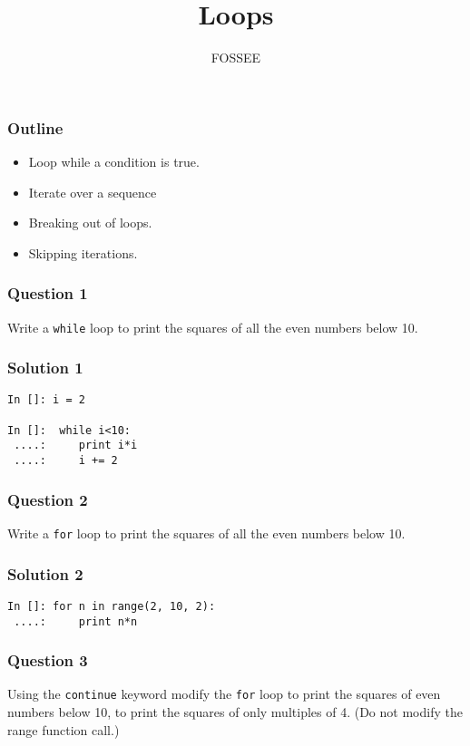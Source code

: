\documentclass[presentation]{beamer}
\title{Loops}
\author{FOSSEE}
\date{}
\begin{document}
\maketitle









\begin{frame}
\frametitle{Outline}
\label{sec-1}

\begin{itemize}
\item Loop while a condition is true.
\item Iterate over a sequence
\item Breaking out of loops.
\item Skipping iterations.
\end{itemize}
\end{frame}
\begin{frame}
\frametitle{Question 1}
\label{sec-2}

  Write a \texttt{while} loop to print the squares of all the even
  numbers below 10. 
\end{frame}
\begin{frame}[fragile]
\frametitle{Solution 1}
\label{sec-3}

\lstset{language=Python}
\begin{lstlisting}
In []: i = 2

In []:  while i<10:
 ....:     print i*i
 ....:     i += 2
\end{lstlisting}
\end{frame}
\begin{frame}
\frametitle{Question 2}
\label{sec-4}

  Write a \texttt{for} loop to print the squares of all the even numbers
  below 10.
\end{frame}
\begin{frame}[fragile]
\frametitle{Solution 2}
\label{sec-5}

\lstset{language=Python}
\begin{lstlisting}
In []: for n in range(2, 10, 2):
 ....:     print n*n
\end{lstlisting}
\end{frame}
\begin{frame}
\frametitle{Question 3}
\label{sec-6}

  Using the \texttt{continue} keyword modify the \texttt{for} loop to print the
  squares of even numbers below 10, to print the squares of only
  multiples of 4. (Do not modify the range function call.)
\end{frame}
\end{document}
